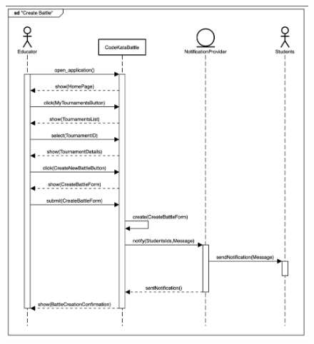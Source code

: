 \documentclass{Configuration_Files/Template}
\begin{document}
\begin{figure}[H]
\includegraphics[scale = 0.45]{Images/SequenceDiagrams/EducatorCreatesBattleSeqDiagram.png}\\
\centering
\end{figure}
\end{document}
